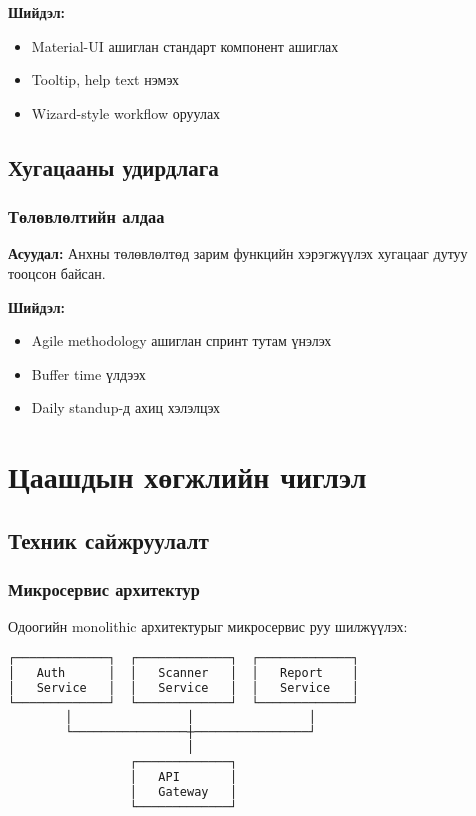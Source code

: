 \documentclass[main.tex]{subfiles}
\begin{document}
\textbf{Шийдэл:}
\begin{itemize}
    \item Material-UI ашиглан стандарт компонент ашиглах
    \item Tooltip, help text нэмэх
    \item Wizard-style workflow оруулах
\end{itemize}

\subsection{Хугацааны удирдлага}

\subsubsection{Төлөвлөлтийн алдаа}
\textbf{Асуудал:} Анхны төлөвлөлтөд зарим функцийн хэрэгжүүлэх хугацааг дутуу тооцсон байсан.

\textbf{Шийдэл:}
\begin{itemize}
    \item Agile methodology ашиглан спринт тутам үнэлэх
    \item Buffer time үлдээх
    \item Daily standup-д ахиц хэлэлцэх
\end{itemize}

\section{Цаашдын хөгжлийн чиглэл}

\subsection{Техник сайжруулалт}

\subsubsection{Микросервис архитектур}
Одоогийн monolithic архитектурыг микросервис руу шилжүүлэх:

\begin{lstlisting}[language=bash, caption=Микросервис архитектур]
┌─────────────┐  ┌─────────────┐  ┌─────────────┐
│   Auth      │  │   Scanner   │  │   Report    │
│   Service   │  │   Service   │  │   Service   │
└─────────────┘  └─────────────┘  └─────────────┘
        │                │                │
        └────────────────┼────────────────┘
                         │
                 ┌─────────────┐
                 │   API       │
                 │   Gateway   │
                 └─────────────┘
\end{lstlisting}
\end{document}
